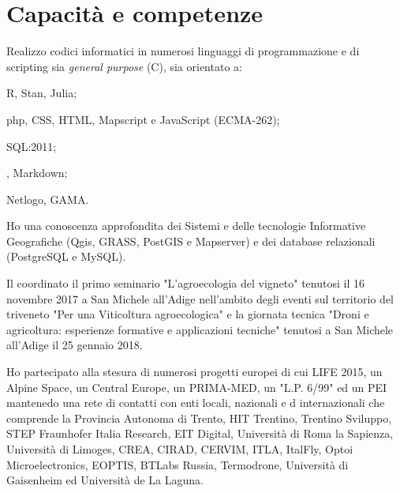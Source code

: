 \documentclass{curriculum}
\begin{document}
    \section{Capacità e competenze}
        Realizzo codici informatici in numerosi linguaggi di programmazione e di scripting sia \textit{general purpose} (C), sia orientato a:
        \begin{description}[labelindent= 1em, labelsep*=0.5em, leftmargin=!, style= standard, font=\normalfont\textit]
            \item[statistica:] R, Stan, Julia;
            \item[web:] php, CSS, HTML, Mapscript e JavaScript (ECMA-262);
            \item[database:] SQL:2011;
            \item[testi:] , Markdown;
            \item[sistemi complessi:] Netlogo, GAMA.
        \end{description}
        
        Ho una conoscenza approfondita dei Sistemi e delle tecnologie Informative Geografiche (Qgis, GRASS, PostGIS e Mapserver) e dei database relazionali (PostgreSQL e MySQL). 
        
        Il coordinato il primo seminario "L'agroecologia del vigneto" tenutosi il 16 novembre 2017 a San Michele all'Adige nell'ambito degli eventi sul territorio del triveneto "Per una Viticoltura agroecologica" e la giornata tecnica "Droni e agricoltura: esperienze formative e applicazioni tecniche" tenutosi a San Michele all'Adige il 25 gennaio 2018.
        
        Ho partecipato alla stesura di numerosi progetti europei di cui  LIFE 2015, un Alpine Space, un Central Europe, un PRIMA-MED, un "L.P. 6/99" ed un PEI mantenedo una rete di contatti con enti locali, nazionali e d internazionali che comprende la Provincia Autonoma di Trento, HIT Trentino, Trentino Sviluppo, STEP Fraunhofer Italia Research, EIT Digital, Università di Roma la Sapienza, Università di Limoges, CREA, CIRAD, CERVIM, ITLA, ItalFly, Optoi Microelectronics, EOPTIS, BTLabs Russia, Termodrone, Università di Gaisenheim ed Università de La Laguna.
        
\end{document}
